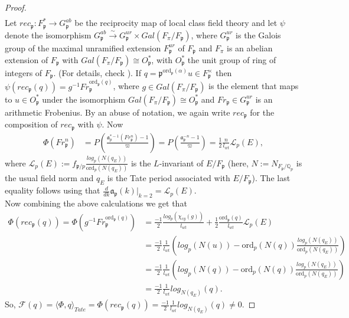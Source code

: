 \documentclass[reqno,10pt]{amsart}
\newcommand{\qp}{\mathbb{Q}_{p}}
\newcommand{\ma}{\mathfrak{a}}
\newcommand{\p}{\mathfrak{p}}
\newcommand{\vp}{\varpi}
\theoremstyle{plain}
\theoremstyle{definition}
\begin{document}
\begin{proof}
\begin{align*}
    \end{align*}
    Let $rec_\p : F_\p^* \rightarrow G_\p^{ab}$ be the reciprocity map of local class field theory and let $\psi$ denote the isomorphism $G_\p^{ab} \xrightarrow{\sim} G_\p^{ur} \times Gal(F_\pi/F_\p)$, where $G_\p^{ur}$ is the Galois group of the maximal unramified extension $F_\p^{ur}$ of $F_\p$ and $F_\pi$ is an abelian extension of $F_\p$ with $Gal(F_\pi/F_\p) \cong O_\p^*$, with $O_\p^*$ the unit group of ring of integers of $F_\p$. (For details, check \cite[Section 3]{Serre}). If $q = \p^{\mathrm{ord}_\p(\alpha)}u \in F_\p^\times$ then $\psi(rec_\p(q)) = g^{-1} Fr_\p^{\mathrm{ord}_\p(q)}$, where $g \in Gal(F_\pi/F_\p)$ is the element that maps to $u \in O_\p^*$ under the isomorphism $Gal(F_\pi/F_\p) \cong O_\p^*$ and $Fr_\p \in G_\p^{ur}$ is an arithmetic Frobenius. By an abuse of notation, we again write $rec_\p$ for the composition of $rec_\p$ with $\psi$. Now
    \begin{align*}
        \Phi(Fr_\p^n) & = P \left(\frac{\ma_p^{*-1}(Fr_\p^n) - 1}{\vp} \right) = P \left(\frac{\ma_\p^{-n} - 1}{\vp} \right) = \frac{1}{2} \frac{n}{l_{wt}} \mathscr{L}_p(E),
    \end{align*}
    where $\mathscr{L}_p(E) := f_{\p/p} \frac{log_p(N(q_E))}{\mathrm{ord}_p(N(q_E))}$ is the $L$-invariant of $E/F_\p$ (here, $N := N_{F_\p/\qp}$ is the usual field norm and $q_E$ is the Tate period associated with $E/F_\p$). The last equality follows using \cite[Proposition 8.7]{MokExceptionalZero} that $\frac{d}{dk}\ma_\p(k)|_{k=2} = \mathscr{L}_p(E)$.  
    \\
    Now combining the above calculations we get that
    \begin{align*}
        \Phi(rec_\p(q)) = \Phi(g^{-1}Fr_\p^{\mathrm{ord}_\p(q)}) & = \frac{-1}{2} \frac{log_p(\chi_{cy}(g))}{l_{wt}} + \frac{1}{2} \frac{\mathrm{ord}_\p(q)}{l_{wt}} \mathscr{L}_p(E) \\
        & = \frac{-1}{2} \frac{1}{l_{wt}} \left(log_p(N(u)) - \mathrm{ord}_p(N(q)) \frac{log_p(N(q_E))}{\mathrm{ord}_p(N(q_E))} \right) \\
        & = \frac{-1}{2} \frac{1}{l_{wt}} \left(log_p(N(q)) - \mathrm{ord}_p(N(q)) \frac{log_p(N(q_E))}{\mathrm{ord}_p(N(q_E))} \right) \\
        & = \frac{-1}{2} \frac{1}{l_{wt}} log_{N(q_E)}(q). 
    \end{align*}
    So, $\mathcal{F}(q) = \langle \Phi,q \rangle_{Tate} = \Phi(rec_\p(q)) = \frac{-1}{2} \frac{1}{l_{wt}} log_{N(q_E)}(q) \neq 0$.
\end{proof}
\end{document}
